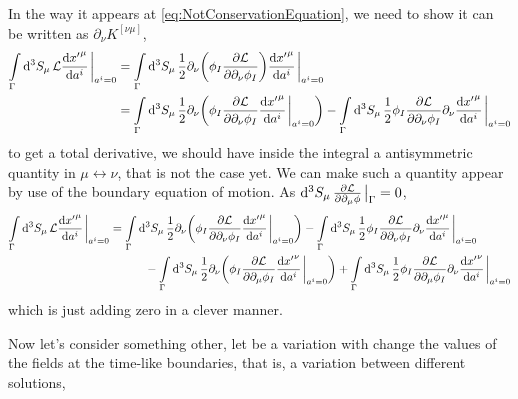 In the way it appears at \cref{eq:NotConservationEquation}, we need to show it can be written as $\partial_\nu K^{[\nu\mu]}$,
\begin{align}
    \int\limits_{\Gamma}\dd[3]{S_\mu}\mathcal L\dv{{x'}^\mu}{a^i}\eval_{a^i=0}&=\int\limits_{\Gamma}\dd[3]{S_\mu}\frac12 \partial_\nu\qty(\phi_I\pdv{\mathcal L}{\partial_\nu\phi_I})\dv{{x'}^\mu}{a^i}\eval_{a^i=0}\\
    &=\int\limits_{\Gamma}\dd[3]{S_\mu}\frac12 \partial_\nu\qty(\phi_I\pdv{\mathcal L}{\partial_\nu\phi_I}\dv{{x'}^\mu}{a^i}\eval_{a^i=0})-\int\limits_{\Gamma}\dd[3]{S_\mu}\frac12 \phi_I\pdv{\mathcal L}{\partial_\nu\phi_I}\partial_\nu\dv{{x'}^\mu}{a^i}\eval_{a^i=0}
\end{align}
to get a total derivative, we should have inside the integral a antisymmetric quantity in $\mu\leftrightarrow\nu$, that is not 
the case yet. We can make such a quantity appear by use of the boundary equation of motion. As $\dd[3]{S_\mu}\pdv{\mathcal L}{\partial_\mu\phi}\eval_{\Gamma}=0$, 
\begin{align}
    \int\limits_{\Gamma}\dd[3]{S_\mu}\mathcal L\dv{{x'}^\mu}{a^i}\eval_{a^i=0}&=\int\limits_{\Gamma}\dd[3]{S_\mu}\frac12 \partial_\nu\qty(\phi_I\pdv{\mathcal L}{\partial_\nu\phi_I}\dv{{x'}^\mu}{a^i}\eval_{a^i=0})-\int\limits_{\Gamma}\dd[3]{S_\mu}\frac12 \phi_I\pdv{\mathcal L}{\partial_\nu\phi_I}\partial_\nu\dv{{x'}^\mu}{a^i}\eval_{a^i=0}\\
    &\quad\quad\quad-\int\limits_{\Gamma}\dd[3]{S_\mu}\frac12 \partial_\nu\qty(\phi_I\pdv{\mathcal L}{\partial_\mu\phi_I}\dv{{x'}^\nu}{a^i}\eval_{a^i=0})+\int\limits_{\Gamma}\dd[3]{S_\mu}\frac12 \phi_I\pdv{\mathcal L}{\partial_\mu\phi_I}\partial_\nu\dv{{x'}^\nu}{a^i}\eval_{a^i=0}
\end{align}
which is just adding zero in a clever manner.















Now let's consider something other, let be a variation with change the values of the fields at the time-like boundaries, that is, 
a variation between different solutions,

